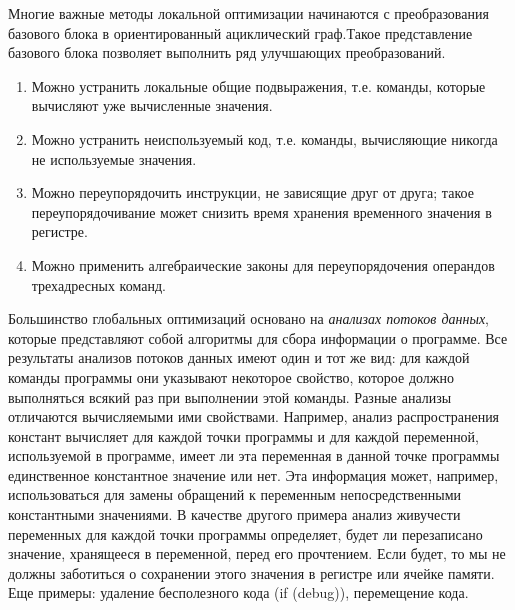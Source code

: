 \documentclass[a4paper,12pt]{article}
\begin{document}
Многие важные методы локальной оптимизации начинаются с преобразования базового блока в ориентированный ациклический граф.Такое представление базового блока позволяет выполнить ряд улучшающих преобразований.
\begin{enumerate}
\item Можно устранить локальные общие подвыражения, т.е. команды, которые вычисляют уже вычисленные значения.
\item Можно устранить неиспользуемый код, т.е. команды, вычисляющие никогда не используемые значения.
\item Можно переупорядочить инструкции, не зависящие друг от друга; такое переупорядочивание может снизить время хранения временного значения в регистре.
\item Можно применить алгебраические законы для переупорядочения операндов трехадресных команд.
\end{enumerate}

Большинство глобальных оптимизаций основано на \textit{анализах потоков данных}, которые представляют собой алгоритмы для сбора информации о программе. Все результаты анализов потоков данных имеют один и тот же вид: для каждой команды программы они указывают некоторое свойство, которое должно выполняться всякий раз при выполнении этой команды. Разные анализы отличаются вычисляемыми ими свойствами. Например, анализ распространения констант вычисляет для каждой точки программы и для каждой переменной, используемой в программе, имеет ли эта переменная в данной точке программы единственное константное значение или нет. Эта информация может, например, использоваться для замены обращений к переменным непосредственными константными значениями. В качестве другого примера анализ живучести переменных для каждой точки программы определяет, будет ли перезаписано значение, хранящееся в переменной, перед его прочтением. Если будет, то мы не должны заботиться о сохранении этого значения в регистре или ячейке памяти. Еще примеры: удаление бесполезного кода (if (debug){}), перемещение кода.
\end{document}
